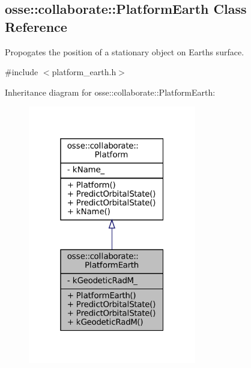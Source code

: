 \hypertarget{classosse_1_1collaborate_1_1_platform_earth}{}\subsection{osse\+:\+:collaborate\+:\+:Platform\+Earth Class Reference}
\label{classosse_1_1collaborate_1_1_platform_earth}


Propogates the position of a stationary object on Earth\textquotesingle{}s surface.  




{\ttfamily \#include $<$platform\+\_\+earth.\+h$>$}



Inheritance diagram for osse\+:\+:collaborate\+:\+:Platform\+Earth\+:
\nopagebreak
\begin{figure}[H]
\begin{center}
\leavevmode
\includegraphics[width=208pt]{classosse_1_1collaborate_1_1_platform_earth__inherit__graph}
\end{center}
\end{figure}
